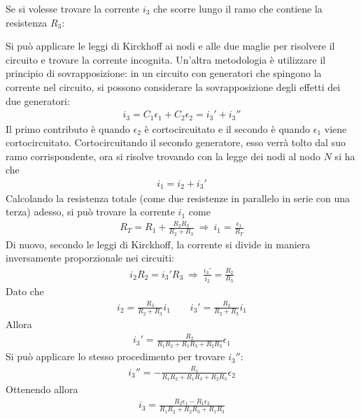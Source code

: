 \documentclass[a4paper, oneside]{article}
\begin{document}
\begin{example}
    Se si volesse trovare la corrente $i_3$ che scorre lungo il ramo che 
    contiene la resistenza $R_3$:

    Si può applicare le leggi di Kirckhoff ai nodi e alle due maglie 
    per risolvere il circuito e trovare la corrente incognita. Un'altra 
    metodologia è utilizzare il principio di sovrapposizione:
    in un circuito con generatori che spingono la corrente nel circuito, si possono considerare
    la sovrapposizione degli effetti dei due generatori:
    \begin{gather*}
        i_3 = C_1 \epsilon_1 + C_2 \epsilon_2 = i_3' + i_3''
    \end{gather*}
    Il primo contributo è quando $\epsilon_2$ è cortocircuitato e 
    il secondo è quando $\epsilon_1$ viene cortocircuitato. Cortocircuitando 
    il secondo generatore, esso verrà tolto dal suo ramo corrispondente, ora si 
    risolve trovando con la legge dei nodi al nodo $N$ si ha che
    \begin{gather*}
        i_1 = i_2 + i_3'
    \end{gather*}
    Calcolando la resistenza totale (come due resistenze in parallelo in serie con una terza)
    adesso, si può trovare la corrente $i_1$ come
    \begin{gather*}
        R_T = R_1 + \frac{R_2R_3}{R_2 + R_3} \ \Longrightarrow \ i_1 = \frac{\epsilon_1}{R_T}
    \end{gather*}
    Di nuovo, secondo le leggi di Kirckhoff, la corrente si divide in maniera inversamente 
    proporzionale nei circuiti:
    \begin{gather*}
        i_2 R_2 = i_3' R_3 \ \Longrightarrow \ \frac{i_3'}{i_2} = \frac{R_2}{R_3} 
    \end{gather*}
    Dato che
    \begin{gather*}
        i_2 = \frac{R_3}{R_2 + R_3} i_1 \qquad i_3' = \frac{R_2}{R_2 + R_3} i_1 
    \end{gather*}
    Allora 
    \begin{gather*}
        i_3' = \frac{R_2}{R_1R_2 + R_1 R_3 + R_2R_3}\epsilon_1
    \end{gather*}
    Si può applicare lo stesso procedimento per trovare $i_3''$:
    \begin{gather*}
        i_3'' = -\frac{R_1}{R_1R_2 + R_1 R_3 + R_2 R_3} \epsilon_2
    \end{gather*}
    Ottenendo allora 
    \begin{gather*}
        i_3 = \frac{R_2 \epsilon_1 - R_1 \epsilon_2}{R_1R_2 + R_2 R_3+ R_1 R_3}
    \end{gather*}
\end{example}
\end{document}
